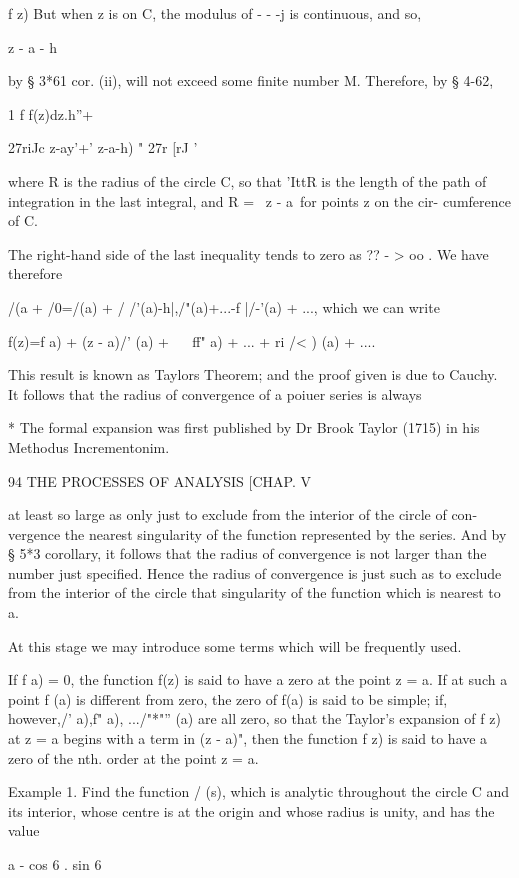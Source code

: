 {{f z) But when z is on C, the modulus of - - -j is continuous, and so,

z - a - h

by § 3*61 cor. (ii), will not exceed some finite number M. Therefore,
by § 4-62,

1 f f(z)dz.h''+

27riJc z-ay'+' z-a-h) " 27r [rJ '

where R is the radius of the circle C, so that 'IttR is the length of
the path of integration in the last integral, and R = \ z - a\ for
points z on the cir- cumference of C.

The right-hand side of the last inequality tends to zero as ?? - > oo
. We have therefore

/(a + /0=/(a) + / /'(a)-h|,/"(a)+...-f |/-'(a) + ..., which we can
write

f(z)=f a) + (z - a)/' (a) + ~ ~ff" a) + ... + ri /< ) (a) + ....

This result is known as Taylors Theorem; and the proof given is due
to Cauchy. It follows that the radius of convergence of a poiuer
series is always

* The formal expansion was first published by Dr Brook Taylor (1715)
in his Methodus Incrementonim.

94 THE PROCESSES OF ANALYSIS [CHAP. V

at least so large as only just to exclude from the interior of the
circle of con- vergence the nearest singularity of the function
represented by the series. And by § 5*3 corollary, it follows that the
radius of convergence is not larger than the number just specified.
Hence the radius of convergence is just such as to exclude from the
interior of the circle that singularity of the function which is
nearest to a.

At this stage we may introduce some terms which will be frequently
used.

If f a) = 0, the function f(z) is said to have a zero at the point z =
a. If at such a point f (a) is different from zero, the zero of f(a)
is said to be simple; if, however,/' a),f" a), .../"*"'' (a) are all
zero, so that the Taylor's expansion of f z) at z = a begins with a
term in (z - a)", then the function f z) is said to have a zero of the
nth. order at the point z = a.

Example 1. Find the function / (s), which is analytic throughout the
circle C and its interior, whose centre is at the origin and whose
radius is unity, and has the value

a - cos 6 . sin 6

}}

